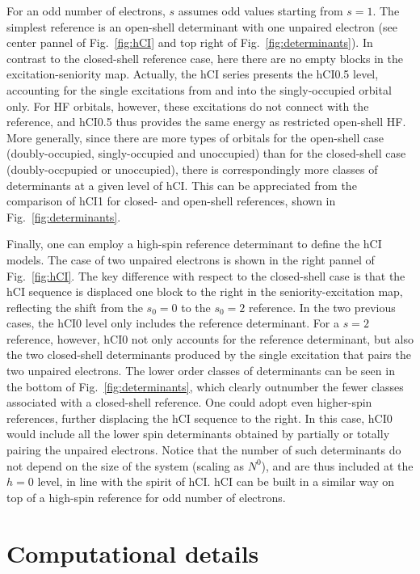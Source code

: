 \documentclass[aip,jcp,reprint,noshowkeys,superscriptaddress]{revtex4-1}
\begin{document}
For an odd number of electrons, $s$ assumes odd values starting from $s=1$.
The simplest reference is an open-shell determinant with one unpaired electron (see center pannel of Fig.~\ref{fig:hCI} and top right of Fig.~\ref{fig:determinants}).
In contrast to the closed-shell reference case, here there are no empty blocks in the excitation-seniority map.
Actually, the hCI series presents the hCI0.5 level, accounting for the single excitations from and into the singly-occupied orbital only.
For HF orbitals, however, these excitations do not connect with the reference, and hCI0.5 thus provides the same energy as restricted open-shell HF.
More generally, since there are more types of orbitals for the open-shell case (doubly-occupied, singly-occupied and unoccupied) than for the closed-shell case (doubly-occpupied or unoccupied),
there is correspondingly more classes of determinants at a given level of hCI.
This can be appreciated from the comparison of hCI1 for closed- and open-shell references, shown in Fig.~\ref{fig:determinants}.

Finally, one can employ a high-spin reference determinant to define the hCI models.
The case of two unpaired electrons is shown in the right pannel of Fig.~\ref{fig:hCI}.
The key difference with respect to the closed-shell case is that the hCI sequence is displaced one block to the right in the seniority-excitation map,
reflecting the shift from the $s_0=0$ to the $s_0=2$ reference.
In the two previous cases, the hCI0 level only includes the reference determinant.
For a $s=2$ reference, however, hCI0 not only accounts for the reference determinant,
but also the two closed-shell determinants produced by the single excitation that pairs the two unpaired electrons.
The lower order classes of determinants can be seen in the bottom of Fig.~\ref{fig:determinants},
which clearly outnumber the fewer classes associated with a closed-shell reference.
One could adopt even higher-spin references, further displacing the hCI sequence to the right.
In this case, hCI0 would include all the lower spin determinants obtained by partially or totally pairing the unpaired electrons.
Notice that the number of such determinants do not depend on the size of the system (scaling as $N^0$), and are thus included at the $h=0$ level, in line with the spirit of hCI.
hCI can be built in a similar way on top of a high-spin reference for odd number of electrons.




\section{Computational details}
\label{sec:compdet}
\end{document}
